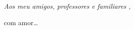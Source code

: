 \null
\vfill

{\normalsize \it \hfill Aos meu amigos, professores e familiares , \vspace*{4pt}

\hfill com amor\dots}
